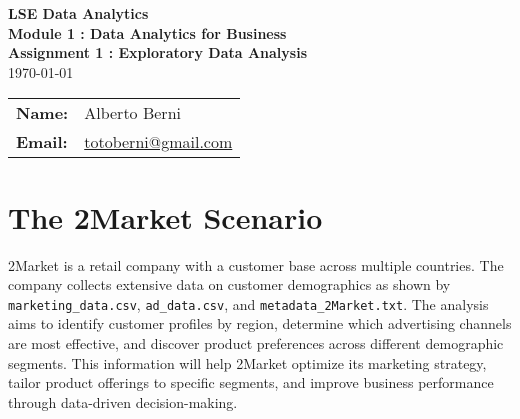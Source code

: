 \documentclass[12pt,a4paper]{article}
\newcommand{\textittt}[1]{\texttt{#1}}
\begin{document}
\begin{titlepage}
  \centering
  \vspace*{8cm}
  {\Huge \textbf{LSE Data Analytics}}\\[1.5cm]
  {\Large \textbf{Module 1 : Data Analytics for Business}}\\[0.3cm]
  {\Large \textbf{Assignment 1 : Exploratory Data Analysis}}\\[1cm]
  {\large \today}\\[1cm]
  \begin{tabular}{ll}
    \textbf{Name:} & Alberto Berni \\
    \textbf{Email:} & \href{mailto:totoberni@gmail.com}{totoberni@gmail.com} \\
  \end{tabular}
  \vfill
\end{titlepage}

\tableofcontents
\newpage

\setcounter{page}{1}

\section{The 2Market Scenario}

2Market is a retail company with a customer base across multiple countries. The company collects extensive data on customer demographics as shown by \textittt{marketing\_data.csv}, \textittt{ad\_data.csv}, and \textittt{metadata\_2Market.txt}. The analysis aims to identify customer profiles by region, determine which advertising channels are most effective, and discover product preferences across different demographic segments. This information will help 2Market optimize its marketing strategy, tailor product offerings to specific segments, and improve business performance through data-driven decision-making.
\end{document}
